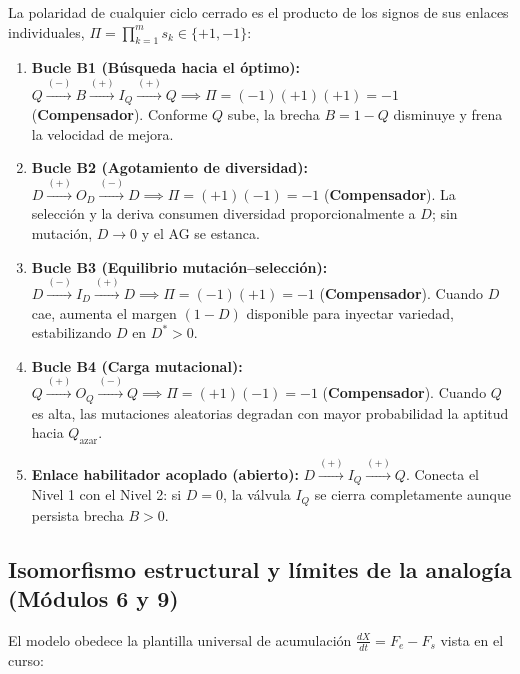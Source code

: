 \documentclass[11pt,a4paper]{article}
\begin{document}
La polaridad de cualquier ciclo cerrado es el producto de los signos de sus enlaces individuales, $\Pi = \prod_{k=1}^{m} s_k \in \{+1, -1\}$:
\begin{enumerate}[leftmargin=1.5em]
    \item \textbf{Bucle B1 (B\'usqueda hacia el \'optimo):}
    $Q \xrightarrow{(-)} B \xrightarrow{(+)} I_Q \xrightarrow{(+)} Q \implies \Pi = (-1)(+1)(+1) = -1$ (\textbf{Compensador}). Conforme $Q$ sube, la brecha $B = 1 - Q$ disminuye y frena la velocidad de mejora.
    \item \textbf{Bucle B2 (Agotamiento de diversidad):}
    $D \xrightarrow{(+)} O_D \xrightarrow{(-)} D \implies \Pi = (+1)(-1) = -1$ (\textbf{Compensador}). La selecci\'on y la deriva consumen diversidad proporcionalmente a $D$; sin mutaci\'on, $D \to 0$ y el AG se estanca.
    \item \textbf{Bucle B3 (Equilibrio mutaci\'on--selecci\'on):}
    $D \xrightarrow{(-)} I_D \xrightarrow{(+)} D \implies \Pi = (-1)(+1) = -1$ (\textbf{Compensador}). Cuando $D$ cae, aumenta el margen $(1-D)$ disponible para inyectar variedad, estabilizando $D$ en $D^* > 0$.
    \item \textbf{Bucle B4 (Carga mutacional):}
    $Q \xrightarrow{(+)} O_Q \xrightarrow{(-)} Q \implies \Pi = (+1)(-1) = -1$ (\textbf{Compensador}). Cuando $Q$ es alta, las mutaciones aleatorias degradan con mayor probabilidad la aptitud hacia $Q_{\text{azar}}$.
    \item \textbf{Enlace habilitador acoplado (abierto):}
    $D \xrightarrow{(+)} I_Q \xrightarrow{(+)} Q$. Conecta el Nivel 1 con el Nivel 2: si $D = 0$, la v\'alvula $I_Q$ se cierra completamente aunque persista brecha $B > 0$.
\end{enumerate}

\subsection{Isomorfismo estructural y l\'imites de la analog\'ia (M\'odulos 6 y 9)}

El modelo obedece la plantilla universal de acumulaci\'on $\frac{dX}{dt} = F_e - F_s$ vista en el curso:
\end{document}
